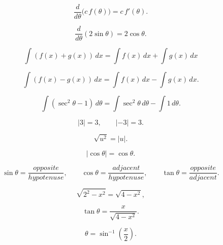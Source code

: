 \documentclass{article}
\begin{document}
\[
\frac{d}{d\theta}\bigl(c\,f(\theta)\bigr)=c\,f'(\theta).
\]

\[
\frac{d}{d\theta}(2\sin\theta)=2\cos\theta.
\]

\[
\int (f(x)+g(x))\,dx=\int f(x)\,dx + \int g(x)\,dx
\]

\[
\int (f(x)-g(x))\,dx=\int f(x)\,dx - \int g(x)\,dx.
\]

\[
\int (\sec^2\theta-1)\,d\theta
 =
 \int \sec^2\theta\,d\theta-\int 1\,d\theta.
\]

\[
|3|=3,\qquad |-3|=3.
\]

\[
\sqrt{u^2}=|u|.
\]

\[
|\cos\theta|=\cos\theta.
\]

\[
\sin\theta=\frac{ opposite }{ hypotenuse },\qquad
 \cos\theta=\frac{ adjacent }{ hypotenuse },\qquad
 \tan\theta=\frac{ opposite }{ adjacent }.
\]

\[
\sqrt{2^2-x^2}=\sqrt{4-x^2},
\]

\[
\tan\theta=\frac{x}{\sqrt{4-x^2}}.
\]

\[
\theta=\sin^{-1}\!\left(\frac{x}{2}\right).
\]
\end{document}
